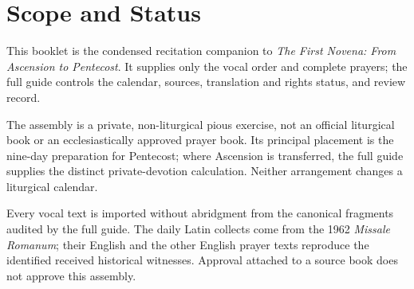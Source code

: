 \section{Scope and Status}

This booklet is the condensed recitation companion to \textit{The First Novena: From Ascension to Pentecost}. It supplies only the vocal order and complete prayers; the full guide controls the calendar, sources, translation and rights status, and review record.

The assembly is a private, non-liturgical pious exercise, not an official liturgical book or an ecclesiastically approved prayer book. Its principal placement is the nine-day preparation for Pentecost; where Ascension is transferred, the full guide supplies the distinct private-devotion calculation. Neither arrangement changes a liturgical calendar.

Every vocal text is imported without abridgment from the canonical fragments audited by the full guide. The daily Latin collects come from the 1962 \textit{Missale Romanum}; their English and the other English prayer texts reproduce the identified received historical witnesses. Approval attached to a source book does not approve this assembly.

